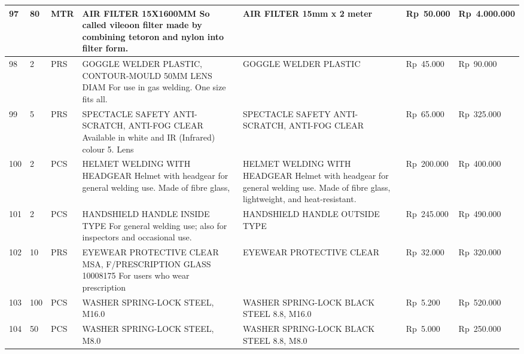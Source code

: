 \documentclass[9pt,a4paper,landscape]{article}
\begin{document}
\begin{longtable}{|C{0.6cm}|C{0.6cm}|C{0.8cm}|L{8.0cm}|L{9.5cm}|R{2.5cm}|R{2.5cm}|}
97 & 80 & MTR &
  AIR FILTER 15X1600MM\newline
  So called vileoon filter made by combining tetoron\newline
  and nylon into filter form. &
  AIR FILTER 15mm x 2 meter &
  Rp~50.000 & Rp~4.000.000 \\
\hline

98 & 2 & PRS &
  GOGGLE WELDER PLASTIC, CONTOUR-MOULD 50MM\newline
  LENS DIAM For use in gas welding. One size fits all. &
  GOGGLE WELDER PLASTIC &
  Rp~45.000 & Rp~90.000 \\
\hline

99 & 5 & PRS &
  SPECTACLE SAFETY ANTI-SCRATCH, ANTI-FOG CLEAR\newline
  Available in white and IR (Infrared) colour 5. Lens &
  SPECTACLE SAFETY ANTI-SCRATCH, ANTI-FOG CLEAR &
  Rp~65.000 & Rp~325.000 \\
\hline

100 & 2 & PCS &
  HELMET WELDING WITH HEADGEAR\newline
  Helmet with headgear for general welding use.\newline
  Made of fibre glass, &
  HELMET WELDING WITH HEADGEAR\newline
  Helmet with headgear for general welding use. Made of fibre glass, lightweight, and heat-resistant. &
  Rp~200.000 & Rp~400.000 \\
\hline

101 & 2 & PCS &
  HANDSHIELD HANDLE INSIDE TYPE\newline
  For general welding use; also for inspectors\newline
  and occasional use. &
  HANDSHIELD HANDLE OUTSIDE TYPE &
  Rp~245.000 & Rp~490.000 \\
\hline

102 & 10 & PRS &
  EYEWEAR PROTECTIVE CLEAR MSA, F/PRESCRIPTION\newline
  GLASS 10008175 For users who wear prescription &
  EYEWEAR PROTECTIVE CLEAR &
  Rp~32.000 & Rp~320.000 \\
\hline

103 & 100 & PCS &
  WASHER SPRING-LOCK STEEL, M16.0 &
  WASHER SPRING-LOCK BLACK STEEL 8.8, M16.0 &
  Rp~5.200 & Rp~520.000 \\
\hline

104 & 50 & PCS &
  WASHER SPRING-LOCK STEEL, M8.0 &
  WASHER SPRING-LOCK BLACK STEEL 8.8, M8.0 &
  Rp~5.000 & Rp~250.000 \\
\hline


\end{longtable}
\end{document}
